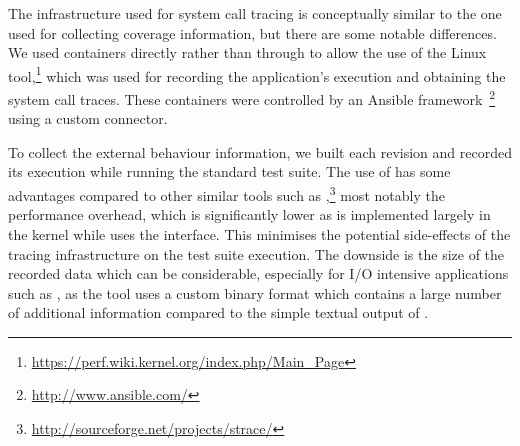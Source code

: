 
The infrastructure used for system call tracing is conceptually similar to the
one used for collecting coverage information, but there are some notable
differences. We used \lxc containers directly rather than through \docker to
allow the use of the Linux 
tool,\footnote{\url{https://perf.wiki.kernel.org/index.php/Main_Page}} which
was used for recording the application's execution and obtaining the system
call traces. These containers were controlled by an Ansible
framework~\footnote{\url{http://www.ansible.com/}} using a custom \lxc
connector.

To collect the external behaviour information, we built each revision and
recorded its execution while running the standard test suite. The use of
 has some advantages compared to other similar tools such as
,\footnote{\url{http://sourceforge.net/projects/strace/}} most
notably the performance overhead, which is significantly lower as
 is implemented largely in the kernel while  uses
the \ptrace interface. This minimises the potential side-effects of the tracing
infrastructure on the test suite execution.  The downside is the size of the
recorded data which can be considerable, especially for I/O intensive
applications such as \redis, as the  tool uses a custom binary
format which contains a large number of additional information compared to the
simple textual output of .



